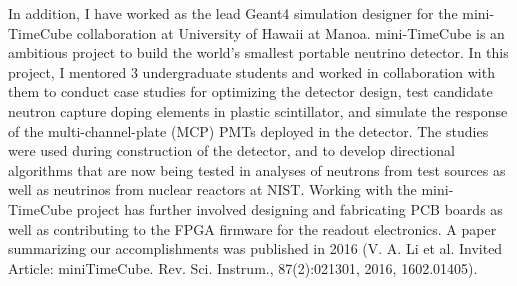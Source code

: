 \documentclass[10pt]{article} %
\begin{document}
%

In addition, I have worked as the lead Geant4 simulation designer for the
mini-TimeCube collaboration at University of Hawaii at Manoa. mini-TimeCube is
an ambitious project to build the world's smallest portable neutrino detector.
In this project, I mentored 3 undergraduate students and worked in
collaboration with them to conduct case studies for optimizing the detector
design, test candidate neutron capture doping elements in plastic scintillator,
and simulate the response of the multi-channel-plate (MCP) PMTs deployed in the
detector. The studies were used during construction of the detector, and to
develop directional algorithms that are now being tested in analyses of
neutrons from test sources as well as neutrinos from nuclear reactors at NIST.
Working with the mini-TimeCube project has further involved designing and
fabricating PCB boards as well as contributing to the FPGA firmware for the
readout electronics. A paper summarizing our accomplishments was published in
2016 (V. A. Li et al. Invited Article: miniTimeCube. Rev. Sci. Instrum.,
87(2):021301, 2016, 1602.01405).
\end{document}
